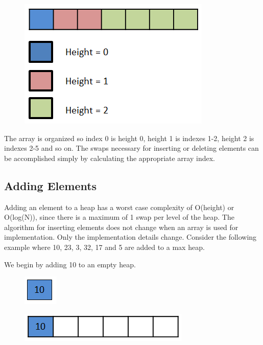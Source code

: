 \begin{figure}[H]
\centering
\includegraphics{pictures/heap0.png}
\label{fig:heap0}
\end{figure}

The array is organized so index 0 is height 0, height 1 is indexes 1-2, height 2 is indexes 2-5 and so on.   The swaps necessary for inserting or deleting elements can be accomplished simply by calculating the appropriate array index.

\subsection{Adding Elements}

Adding an element to a heap has a worst case complexity of O(height) or O(log(N)), since there is a maximum of 1 swap per level of the heap.
The algorithm for inserting elements does not change when an array is used for implementation.  Only the implementation details change.   Consider the following example where 10, 23, 3, 32, 17 and 5 are added to a max heap.

We begin by adding 10 to an empty heap.

\begin{figure}[H]
\centering
\includegraphics{pictures/heap1.png}
\label{fig:heap1}
\end{figure}

\begin{figure}[H]
\centering
\includegraphics{pictures/heap1a.png}
\label{fig:heap1a}
\end{figure}

